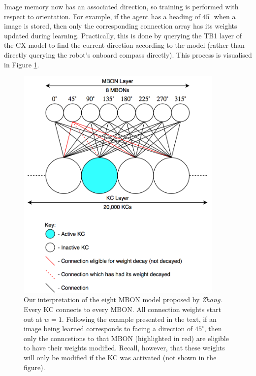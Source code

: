 \documentclass[a4paper,11pt,twoside,openright]{article}
\begin{document}
Image memory now has an associated direction, so training is performed
with respect to orientation. For example, if the agent has a heading
of $45^{\circ}$ when a image is stored, then only the corresponding
connection array has its weights updated during learning. Practically,
this is done by querying the TB1 layer of the CX model to find the
current direction according to the model (rather than directly
querying the robot's onboard compass directly). This process is
visualised in Figure \ref{fig:eightmbon}.
\newline
\par

\begin{figure}[h!]
  \centering
  \includegraphics[width=0.9\textwidth]{EightENModel}
  \caption{\label{fig:eightmbon} Our interpretation of the eight MBON model
    proposed by \textit{Zhang}. Every KC connects to every MBON. All connection
    weights start out at $w=1$. Following the example presented in the text,
    if an image being learned corresponds to facing a direction of $45^{\circ}$,
    then only the conncetions to that MBON (highlighted in red) are eligible to
    have their weights modified. Recall, however, that these weights will only
    be modified if the KC was activated (not shown in the figure).
    }
\end{figure}
\end{document}
